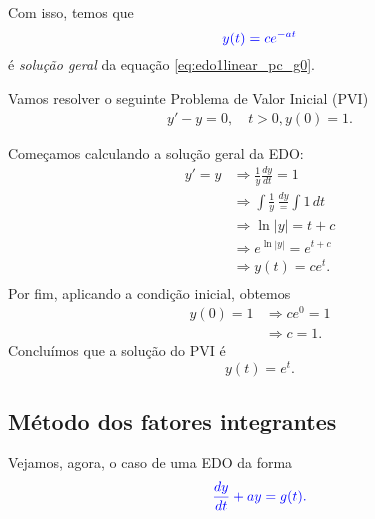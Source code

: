 Com isso, temos que
\begin{equation}
  \color{blue}{y(t) = ce^{-at}}
\end{equation}
é \emph{solução geral} da equação \eqref{eq:edo1linear_pc_g0}.

\begin{ex}
  Vamos resolver o seguinte Problema de Valor Inicial (PVI)
  \begin{align}
    y' - y = 0, \quad t>0,
    y(0) = 1.
  \end{align}
  
  Começamos calculando a solução geral da EDO:
  \begin{align}
    y' = y &\Rightarrow \frac{1}{y}\frac{dy}{dt} = 1 \\
            &\Rightarrow \int \frac{1}{y}\,\frac{dy} = \int 1\,dt \\
            &\Rightarrow \ln|y| = t + c \\
            &\Rightarrow e^{\ln|y|} = e^{t+c}\\
            &\Rightarrow y(t) = ce^{t}.\\
  \end{align}
  Por fim, aplicando a condição inicial, obtemos
  \begin{align}
    y(0) = 1 &\Rightarrow ce^{0} = 1 \\
             &\Rightarrow c = 1.
  \end{align}
  Concluímos que a solução do PVI é
  \begin{equation}
    y(t) = e^{t}.
  \end{equation}
\end{ex}

\subsection{Método dos fatores integrantes}

Vejamos, agora, o caso de uma EDO da forma
\begin{equation}\label{eq:edo1linear_pa_g}
  \color{blue}{\frac{dy}{dt} + ay = g(t).}
\end{equation}

